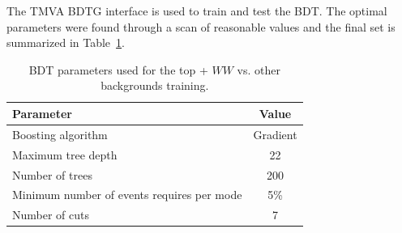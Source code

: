 The TMVA BDTG interface is used to train and test the BDT. The optimal parameters were found through a scan of reasonable values and the final set is summarized in Table~\ref{tab:TopBDTparameters}.
\begin{table}[h!]
\centering
\begin{tabular}{|l|c|}
\hline
Parameter                                    & Value     \\
\hline
Boosting algorithm                           &  Gradient  \\
Maximum tree depth                           &  22       \\
Number of trees                              &  200     \\
Minimum number of events requires per mode   &  5\%      \\
Number of cuts                               &  7        \\
\hline
\end{tabular}
\caption{BDT parameters used for the top + $WW$ vs. other backgrounds training.} 
\label{tab:TopBDTparameters}
\end{table}

